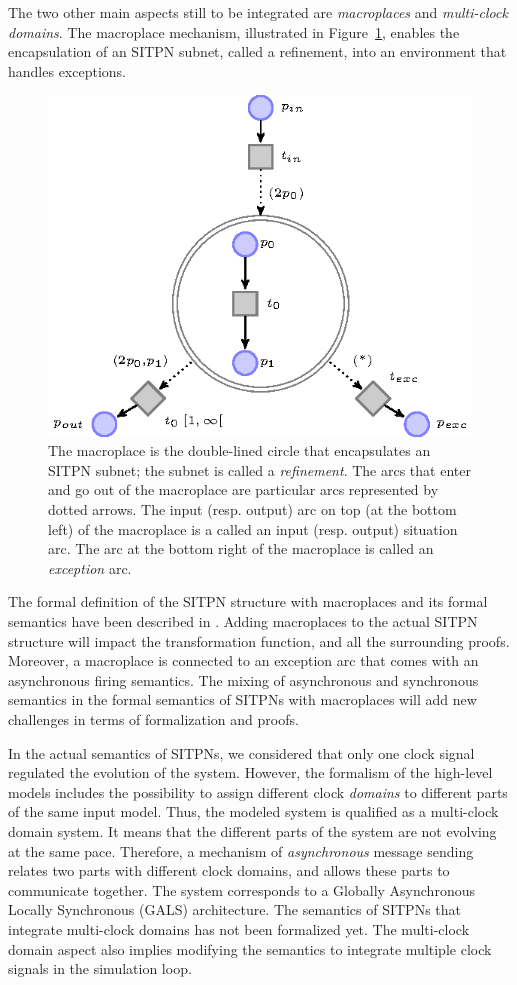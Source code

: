 \documentclass[pdflatex,sn-mathphys]{sn-jnl}%
\theoremstyle{thmstyleone}%
\theoremstyle{thmstyletwo}%
\theoremstyle{thmstylethree}%
\begin{document}
The two other main aspects still to be integrated are
\textit{macro\-places} and \textit{multi-clock domains}.  The
macroplace mechanism, illustrated in Figure~\ref{fig:macroplace},
enables the encapsulation of an SITPN subnet, called a refinement,
into an environment that handles exceptions.

\begin{figure}[H]
  \centering
  \includegraphics[keepaspectratio,width=.6\textwidth]{macroplace.eps}
  \caption[An SITPN model with a macroplace.]{The macroplace is the
    double-lined circle that encapsulates an SITPN subnet; the subnet
    is called a \textit{refinement}. The arcs that enter and go out of
    the macroplace are particular arcs represented by dotted
    arrows. The input (resp. output) arc on top (at the bottom left)
    of the macroplace is a called an input (resp. output) situation
    arc. The arc at the bottom right of the macroplace is called an
    \emph{exception} arc.}
  \label{fig:macroplace}
\end{figure}

The formal definition of the SITPN structure with macroplaces and its
formal semantics have been described in \cite{Leroux2014}. Adding
macroplaces to the actual SITPN structure will impact the
transformation function, and all the surrounding proofs. Moreover, a
macroplace is connected to an exception arc that comes with an
asynchronous firing semantics. The mixing of asynchronous and
synchronous semantics in the formal semantics of SITPNs with
macroplaces will add new challenges in terms of formalization and
proofs.

In the actual semantics of SITPNs, we considered that only one clock
signal regulated the evolution of the system. However, the formalism
of the \hilecop{} high-level models includes the possibility to assign
different clock \textit{domains} to different parts of the same input
model. Thus, the modeled system is qualified as a multi-clock domain
system. It means that the different parts of the system are not
evolving at the same pace. Therefore, a mechanism of
\textit{asynchronous} message sending relates two parts with different
clock domains, and allows these parts to communicate together. The
system corresponds to a Globally Asynchronous Locally Synchronous
(GALS) architecture.  The semantics of SITPNs that integrate
multi-clock domains has not been formalized yet. The multi-clock
domain aspect also implies modifying the \hvhdl{} semantics to
integrate multiple clock signals in the simulation loop.
\end{document}
